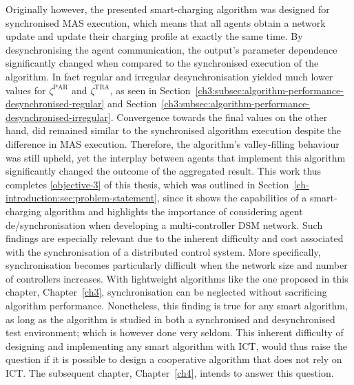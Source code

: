 Originally however, the presented smart-charging algorithm was designed for synchronised MAS execution, which means that all agents obtain a network update and update their charging profile at exactly the same time.
By desynchronising the agent communication, the output's parameter dependence significantly changed when compared to the synchronised execution of the algorithm.
In fact regular and irregular desynchronisation yielded much lower values for $\zeta^\text{PAR}$ and $\zeta^\text{TRA}$, as seen in Section~\ref{ch3:subsec:algorithm-performance-desynchronised-regular} and Section~\ref{ch3:subsec:algorithm-performance-desynchronised-irregular}.
Convergence towards the final values on the other hand, did remained similar to the synchronised algorithm execution despite the difference in MAS execution.
Therefore, the algorithm's valley-filling behaviour was still upheld, yet the interplay between agents that implement this algorithm significantly changed the outcome of the aggregated result.
This work thus completes \ref{objective-3} of this thesis, which was outlined in Section~\ref{ch-introduction:sec:problem-statement}, since it shows the capabilities of a smart-charging algorithm and highlights the importance of considering agent de/synchronisation when developing a multi-controller DSM network.
Such findings are especially relevant due to the inherent difficulty and cost associated with the synchronisation of a distributed control system.
More specifically, synchronisation becomes particularly difficult when the network size and number of controllers increases.
With lightweight algorithms like the one proposed in this chapter, Chapter~\ref{ch3}, synchronisation can be neglected without sacrificing algorithm performance.
Nonetheless, this finding is true for any smart algorithm, as long as the algorithm is studied in both a synchronised and desynchronised test environment; which is however done very seldom.
This inherent difficulty of designing and implementing any smart algorithm with ICT, would thus raise the question if it is possible to design a cooperative algorithm that does not rely on ICT.
The subsequent chapter, Chapter~\ref{ch4}, intends to answer this question.






